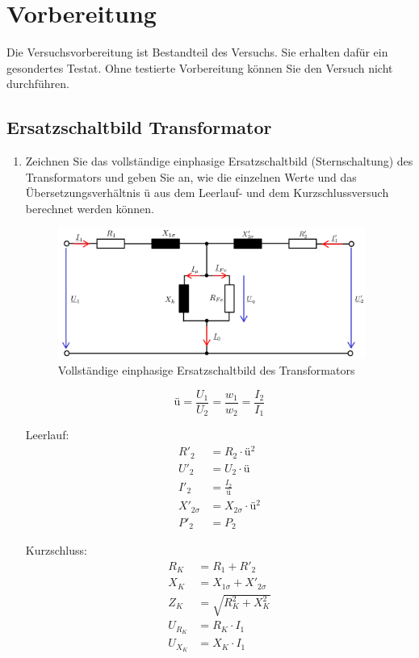 \section{Vorbereitung}
 {Die Versuchsvorbereitung ist Bestandteil des Versuchs. Sie erhalten dafür ein gesondertes Testat.
  Ohne testierte Vorbereitung können Sie den Versuch nicht durchführen.}
\subsection{Ersatzschaltbild Transformator}
\begin{enumerate}[label=\alph*)]
	\item Zeichnen Sie das vollständige einphasige Ersatzschaltbild (Sternschaltung) des
	      Transformators und geben Sie an, wie die einzelnen Werte und das
	      Übersetzungsverhältnis ü aus dem Leerlauf- und dem Kurzschlussversuch berechnet
	      werden können.
	      \begin{figure}[h!]
		      \begin{center}
			      \includegraphics[width=0.95\textwidth]{img/2.1.1.1}
		      \end{center}
		      \caption{Vollständige einphasige Ersatzschaltbild des Transformators}\label{img:2.1.1.1}
	      \end{figure}
	      $$ü=\frac{U_1}{U_2}=\frac{w_1}{w_2}=\frac{I_2}{I_1}$$
	      \begin{minipage}{0.5\textwidth}
		      Leerlauf:
		      \begin{align*}
			      R'_2         & =R_2\cdot ü^2           \\
			      U'_2         & =U_2\cdot ü             \\
			      I'_2         & = \frac{I_2}{ü}         \\
			      X'_{2\sigma} & = X_{2\sigma} \cdot ü^2 \\
			      P'_2         & = P_2
		      \end{align*}
	      \end{minipage}\hfill
	      \begin{minipage}{0.5\textwidth}
		      Kurzschluss:
		      \begin{align*}
			      R_K     & = R_1 + R'_2                 \\
			      X_K     & = X_{1\sigma} + X'_{2\sigma} \\
			      Z_K     & = \sqrt{R_K^2 + X_K^2}       \\
			      U_{R_K} & = R_K \cdot I_1              \\
			      U_{X_K} & = X_K \cdot I_1
		      \end{align*}
	      \end{minipage}


\end{enumerate}
